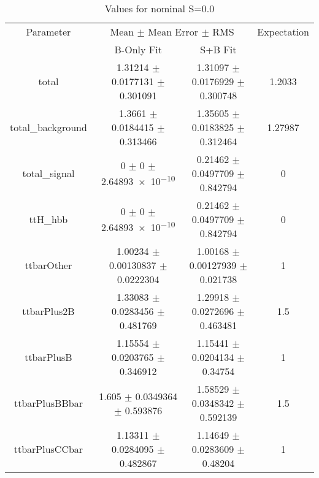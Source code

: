 \begin{table}
\centering
\caption{Values for nominal S=0.0}
\begin{tabular}{cccc}
\toprule
Parameter & \multicolumn{2}{c}{Mean $\pm$ Mean Error $\pm$ RMS} & Expectation\\
 & B-Only Fit & S+B Fit & \\
\midrule
total & \num{1.31214} $\pm$ \num{0.0177131} $\pm$ \num{0.301091} & \num{1.31097} $\pm$ \num{0.0176929} $\pm$ \num{0.300748} & \num{1.2033}\\
total\_background & \num{1.3661} $\pm$ \num{0.0184415} $\pm$ \num{0.313466} & \num{1.35605} $\pm$ \num{0.0183825} $\pm$ \num{0.312464} & \num{1.27987}\\
total\_signal & \num{0} $\pm$ \num{0} $\pm$ \num{2.64893e-10} & \num{0.21462} $\pm$ \num{0.0497709} $\pm$ \num{0.842794} & \num{0}\\
ttH\_hbb & \num{0} $\pm$ \num{0} $\pm$ \num{2.64893e-10} & \num{0.21462} $\pm$ \num{0.0497709} $\pm$ \num{0.842794} & \num{0}\\
ttbarOther & \num{1.00234} $\pm$ \num{0.00130837} $\pm$ \num{0.0222304} & \num{1.00168} $\pm$ \num{0.00127939} $\pm$ \num{0.021738} & \num{1}\\
ttbarPlus2B & \num{1.33083} $\pm$ \num{0.0283456} $\pm$ \num{0.481769} & \num{1.29918} $\pm$ \num{0.0272696} $\pm$ \num{0.463481} & \num{1.5}\\
ttbarPlusB & \num{1.15554} $\pm$ \num{0.0203765} $\pm$ \num{0.346912} & \num{1.15441} $\pm$ \num{0.0204134} $\pm$ \num{0.34754} & \num{1}\\
ttbarPlusBBbar & \num{1.605} $\pm$ \num{0.0349364} $\pm$ \num{0.593876} & \num{1.58529} $\pm$ \num{0.0348342} $\pm$ \num{0.592139} & \num{1.5}\\
ttbarPlusCCbar & \num{1.13311} $\pm$ \num{0.0284095} $\pm$ \num{0.482867} & \num{1.14649} $\pm$ \num{0.0283609} $\pm$ \num{0.48204} & \num{1}\\
\bottomrule
\end{tabular}
\end{table}